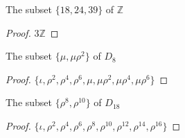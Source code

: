 \newpage
\begin{exercise}
    The subset $\{ 18, 24, 39 \}$ of $\mathbb{Z}$
\end{exercise}

\begin{proof}
    $3\mathbb{Z}$
\end{proof}

\newpage
\begin{exercise}
    The subset $\{ \mu, \mu\rho^{2} \}$ of $D_{8}$
\end{exercise}

\begin{proof}
    $\{ \iota, \rho^{2}, \rho^{4}, \rho^{6}, \mu, \mu\rho^{2}, \mu\rho^{4}, \mu\rho^{6} \}$
\end{proof}

\newpage
\begin{exercise}
    The subset $\{ \rho^{8}, \rho^{10} \}$ of $D_{18}$
\end{exercise}

\begin{proof}
    $\{ \iota, \rho^{2}, \rho^{4}, \rho^{6}, \rho^{8}, \rho^{10}, \rho^{12}, \rho^{14}, \rho^{16} \}$
\end{proof}

